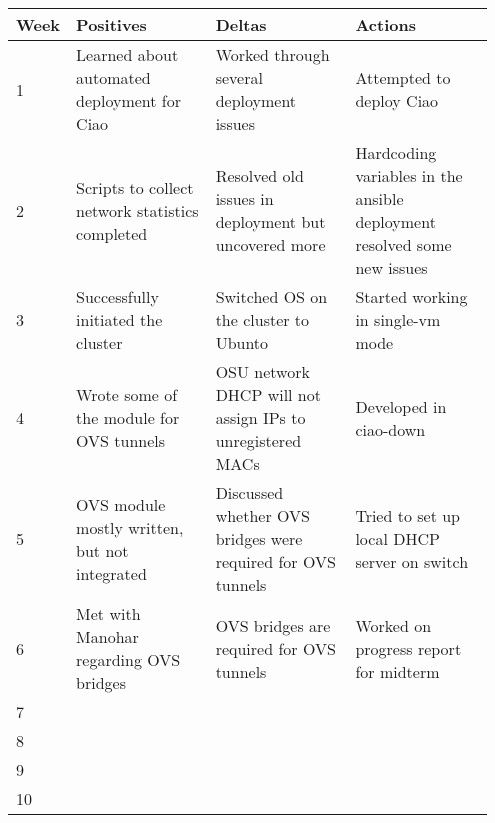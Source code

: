 \documentclass[10pt,onecolumn,journal,draftclsnofoot]{IEEEtran}
\begin{document}
\begin{center}
	\begin{tabular}{| p{0.05\linewidth} | p{0.3\linewidth} | p{0.3\linewidth} |
			p{0.3\linewidth} |}\hline
		Week & Positives & Deltas & Actions \\ \hline

		1 & Learned about automated deployment for Ciao & Worked through
		several deployment issues & Attempted to deploy Ciao \\ \hline

		2 & Scripts to collect network statistics completed & Resolved
		old issues in deployment but uncovered more & Hardcoding
		variables in the ansible deployment resolved some new issues \\
		\hline

		3 & Successfully initiated the cluster & Switched OS on the
		cluster to Ubunto & Started working in single-vm mode \\ \hline

		4 & Wrote some of the module for OVS tunnels & OSU network DHCP
		will not assign IPs to unregistered MACs & Developed in
		ciao-down \\ \hline

		5 & OVS module mostly written, but not integrated & Discussed
		whether OVS bridges were required for OVS tunnels & Tried to set
		up local DHCP server on switch \\ \hline

		6 & Met with Manohar regarding OVS bridges & OVS bridges are
		required for OVS tunnels & Worked on progress report for midterm
		\\ \hline

		7 & \\ \hline

		8 & \\ \hline

		9 & \\ \hline

		10 & \\ \hline

	\end{tabular}
\end{center}



\end{document}
